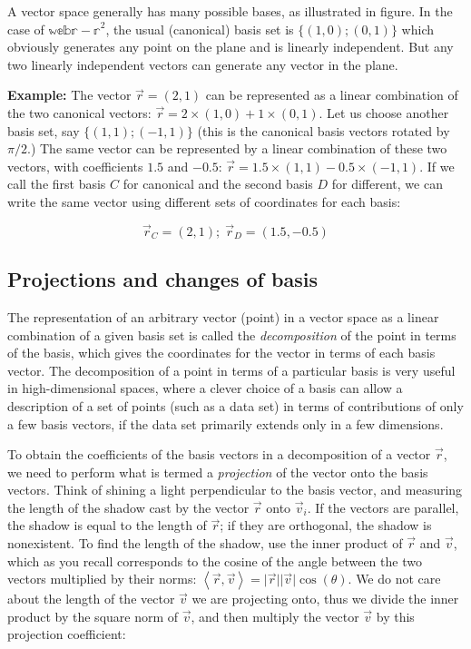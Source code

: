 \documentclass[
  letterpaper,
  DIV=11,
  numbers=noendperiod]{scrreprt}
\begin{document}
A vector space generally has many possible bases, as illustrated in
figure. In the case of \(\mathbb{webr-r}^2\), the usual (canonical)
basis set is \(\{(1,0); (0,1)\}\) which obviously generates any point on
the plane and is linearly independent. But any two linearly independent
vectors can generate any vector in the plane.

\textbf{Example:} The vector \(\vec r = (2,1)\) can be represented as a
linear combination of the two canonical vectors:
\(\vec r = 2\times (1,0)+1\times (0,1)\). Let us choose another basis
set, say \(\{(1,1); (-1,1)\}\) (this is the canonical basis vectors
rotated by \(\pi/2\).) The same vector can be represented by a linear
combination of these two vectors, with coefficients \(1.5\) and
\(-0.5\): \(\vec r = 1.5\times (1,1) - 0.5 \times (-1,1)\). If we call
the first basis \(C\) for canonical and the second basis \(D\) for
different, we can write the same vector using different sets of
coordinates for each basis:

\[ 
\vec r_{C} = (2,1); \; \vec r_D = (1.5, -0.5)
\]

\subsection{Projections and changes of
basis}\label{projections-and-changes-of-basis}

The representation of an arbitrary vector (point) in a vector space as a
linear combination of a given basis set is called the
\emph{decomposition} of the point in terms of the basis, which gives the
coordinates for the vector in terms of each basis vector. The
decomposition of a point in terms of a particular basis is very useful
in high-dimensional spaces, where a clever choice of a basis can allow a
description of a set of points (such as a data set) in terms of
contributions of only a few basis vectors, if the data set primarily
extends only in a few dimensions.

To obtain the coefficients of the basis vectors in a decomposition of a
vector \(\vec r\), we need to perform what is termed a \emph{projection}
of the vector onto the basis vectors. Think of shining a light
perpendicular to the basis vector, and measuring the length of the
shadow cast by the vector \(\vec r\) onto \(\vec v_i\). If the vectors
are parallel, the shadow is equal to the length of \(\vec r\); if they
are orthogonal, the shadow is nonexistent. To find the length of the
shadow, use the inner product of \(\vec r\) and \(\vec v\), which as you
recall corresponds to the cosine of the angle between the two vectors
multiplied by their norms:
\(\left\langle \vec r, \vec v\right \rangle =\vert\vec r\vert \vert\vec v\vert\cos(\theta)\).
We do not care about the length of the vector \(\vec v\) we are
projecting onto, thus we divide the inner product by the square norm of
\(\vec v\), and then multiply the vector \(\vec v\) by this projection
coefficient:
\end{document}
